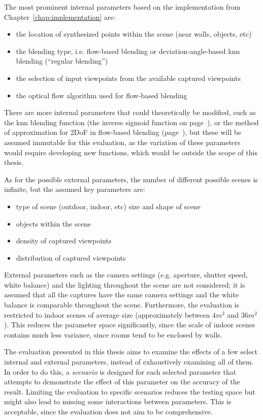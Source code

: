 The most prominent internal parameters based on the implementation from Chapter~\ref{chap:implementation} are:
\begin{itemize}
  \item the location of synthesized points within the scene (near walls, objects, etc)
  \item the blending type, i.e. flow-based blending or deviation-angle-based knn blending (``regular blending'')
  \item the selection of input viewpoints from the available captured viewpoints
  \item the optical flow algorithm used for flow-based blending
\end{itemize}

There are more internal parameters that could theoretically be modified, such as the knn blending function (the inverse sigmoid function on page~\pageref{eq:sigmoid}), or the method of approximation for 2DoF in flow-based blending (page~\pageref{subsec:2dof_flow-based}), but these will be assumed immutable for this evaluation, as the variation of these parameters would require developing new functions, which would be outside the scope of this thesis.

As for the possible external parameters, the number of different possible scenes is infinite, but the assumed key parameters are:
\begin{itemize}
  \item type of scene (outdoor, indoor, etc) \ar size and shape of scene
  \item objects within the scene
  \item density of captured viewpoints
  \item distribution of captured viewpoints
\end{itemize}

External parameters such as the camera settings (e.g. aperture, shutter speed, white balance) and the lighting throughout the scene are not considered; it is assumed that all the captures have the same camera settings and the white balance is comparable throughout the scene. Furthermore, the evaluation is restricted to indoor scenes of average size (approximately between $4m^2$ and $36m^2$). This reduces the parameter space significantly, since the scale of indoor scenes contains much less variance, since rooms tend to be enclosed by walls.

The evaluation presented in this thesis aims to examine the effects of a few select internal and external parameters, instead of exhaustively examining all of them. In order to do this, a \emph{scenario} is designed for each selected parameter that attempts to demonstrate the effect of this parameter on the accuracy of the result. Limiting the evaluation to specific scenarios reduces the testing space but might also lead to missing some interactions between parameters. This is acceptable, since the evaluation does not aim to be comprehensive. 

